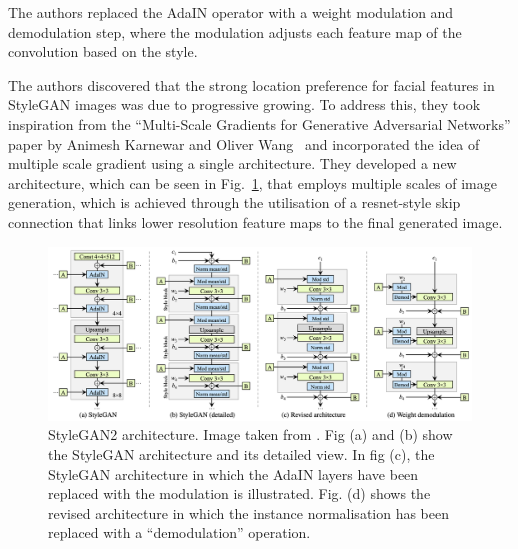 \noindent The authors replaced the AdaIN operator with a weight modulation and demodulation step, where the modulation adjusts each feature map of the convolution based on the style. 

\noindent The authors discovered that the strong location preference for facial features in StyleGAN images was due to progressive growing. To address this, they took inspiration from the “Multi-Scale Gradients for Generative Adversarial Networks” paper by Animesh Karnewar and Oliver Wang~\cite{karnewar2019msg} and incorporated the idea of multiple scale gradient using a single architecture. They developed a new architecture, which can be seen in Fig.~\ref{fig:StyleGAN2 architecture}, that employs multiple scales of image generation, which is achieved through the utilisation of a resnet-style skip connection that links lower resolution feature maps to the final generated image.
 \begin{figure}[htbp]
\centering
  \includegraphics[scale=0.4]{figures/StyleGAN2-architecture.png}
  \caption{StyleGAN2 architecture. Image taken from \cite{Karras2019stylegan2}. Fig (a) and (b) show the StyleGAN architecture and its detailed view. In fig (c), the StyleGAN architecture in which the AdaIN layers have been replaced with the modulation is illustrated. Fig. (d) shows the revised architecture in which the instance normalisation has been replaced with a “demodulation” operation.}
  \label{fig:StyleGAN2 architecture}
\end{figure}

